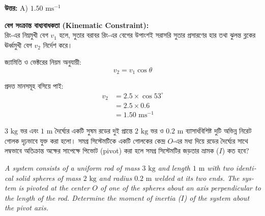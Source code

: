 \documentclass[12pt, a4paper]{article}
\begin{document}
\vspace{0.5em}
\begin{tcolorbox}[answerbox]
    \textbf{\color{success} উত্তর:} A)  $1.50\text{ ms}^{-1}$
\end{tcolorbox}
\vspace{1em}

\begin{tcolorbox}[solutionbox={সমাধান (Solution)}]
    \noindent
    \textbf{বেগ সংক্রান্ত বাধ্যবাধকতা (Kinematic Constraint):} \\
    রিং-এর নিম্নমুখী বেগ $v_1$ হলে, সুতার বরাবর রিং-এর বেগের উপাংশই সরাসরি সুতার প্রসারণের হার তথা ঝুলন্ত ব্লকের ঊর্ধ্বমুখী বেগ $v_2$ নির্দেশ করে।
    
    জ্যামিতি ও ভেক্টরের নিয়ম অনুযায়ী:
    \[ v_2 = v_1 \cos\theta \]
    
    প্রদত্ত মানসমূহ বসিয়ে পাই:
    \begin{align*}
        v_2 &= 2.5 \times \cos 53^\circ \\
            &= 2.5 \times 0.6 \\
            &= \mathbf{1.50}\text{ ms}^{-1}
    \end{align*}
\end{tcolorbox}
\begin{tcolorbox}[questionbox={প্রশ্ন (Question) 11}]
\noindent
$3\text{ kg}$ ভর এবং $1\text{ m}$ দৈর্ঘ্যের একটি সুষম রডের দুই প্রান্তে $2\text{ kg}$ ভর ও $0.2\text{ m}$ ব্যাসার্ধবিশিষ্ট দুটি অভিন্ন নিরেট গোলক দৃঢ়ভাবে যুক্ত করা হলো। সমগ্র সিস্টেমটিকে একটি গোলকের কেন্দ্র $O$-এর মধ্য দিয়ে রডের দৈর্ঘ্যের সাথে লম্বভাবে অতিক্রান্ত অক্ষের সাপেক্ষে পিভোট (pivot) করা হলে সমগ্র সিস্টেমটির জড়তার ভ্রামক ($I$) কত হবে?
\vspace{0.8em}
\begin{english}
\noindent\textit{\color{darkgray}
A system consists of a uniform rod of mass $3\text{ kg}$ and length $1\text{ m}$ with two identical solid spheres of mass $2\text{ kg}$ and radius $0.2\text{ m}$ welded at its two ends. The system is pivoted at the center $O$ of one of the spheres about an axis perpendicular to the length of the rod. Determine the moment of inertia ($I$) of the system about the pivot axis.
}
\end{english}
\end{tcolorbox}
\end{document}
